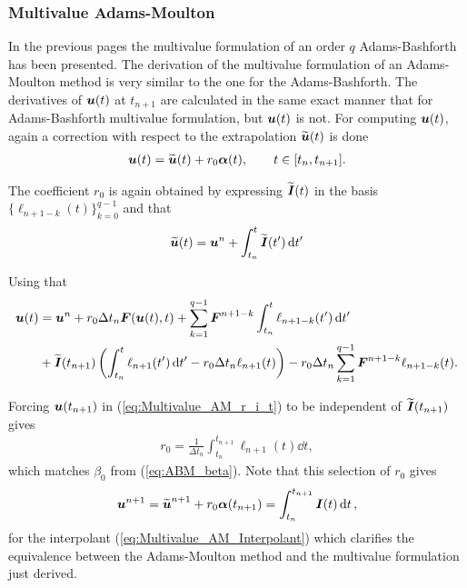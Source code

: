 \subsubsection*{Multivalue Adams-Moulton}
In the previous pages the multivalue formulation of an order $q$ Adams-Bashforth has been presented. The derivation of the multivalue formulation of an Adams-Moulton method is very similar to the one for the Adams-Bashforth. The derivatives of $\boldsymbol{u}(t)$ at $t_{n+1}$ are calculated in the same exact manner that for Adams-Bashforth multivalue formulation, but $\boldsymbol{u}(t)$ is not. For computing $\boldsymbol{u}(t)$, again a correction with respect to the extrapolation $\widetilde{\boldsymbol{u}}(t)$ is done
%
\begin{align}
	\boldsymbol{u}(t)
	=
	\widetilde{\boldsymbol{u}}(t)
	+
	r_0 \boldsymbol{\alpha}(t),
	\qquad
	t\in[t_{n},t_{n+1}]
	\label{eq:Multivalue_AM}.
\end{align}

The coefficient $r_0$ is again obtained by expressing $\widetilde{ \boldsymbol{I}}(t)$ in the basis $\{\ell_{n+1-k}(t)\}_{k=0}^{q-1}$ and
that
%
\begin{align}
	\widetilde{\boldsymbol{u}}(t)
	=
	\boldsymbol{u}^n
	+
	\int_{t_n}^{t}
	\widetilde{ \boldsymbol{I}}(t')
	\dd{t'}
\end{align}

Using that 
\begin{align}
	\boldsymbol{u}(t)
	& = 
	\boldsymbol{u}^n
	+
	r_0
	\Delta t_n
	\boldsymbol{F}(\boldsymbol{u}(t),t)
	+
	\sum_{k=1}^{q-1}
	\boldsymbol{F}^{n+1-k}
	\int_{t_n}^{t}
	\ell_{n+1-k}(t')
	\dd{t'}
	\nonumber
	\\
	&
	+
	\widetilde{\boldsymbol{I}}(t_{n+1})
	\left(
	\int_{t_n}^{t}
	\ell_{n+1}(t')
	\dd{t'}
    -
    r_0 \Delta t_n
	\ell_{n+1}(t)
	\right)
	-
	r_0	\Delta t_n
	\sum_{k=1}^{q-1}
	\boldsymbol{F}^{n+1-k}
	\ell_{n+1-k}(t)
	.
	\label{eq:Multivalue_AM_r_i_t}
\end{align}

Forcing $\boldsymbol{u}(t_{n+1})$ in (\ref{eq:Multivalue_AM_r_i_t}) to be independent of $\widetilde{\boldsymbol{I}}(t_{n+1})$ gives
%
\begin{align}
	r_0 
	=
	\frac{1}{\Delta t_n}
	\int_{t_n}^{t_{n+1}}
	\ell_{n+1}(t)
	\dd{t},
    \label{eq:Multivalue_AM_r0}
\end{align}
which matches $\beta_0$ from (\ref{eq:ABM_beta}). Note that this selection of $r_0$ gives 
%
\begin{align}
	\boldsymbol{u}^{n+1}
	=
	\widetilde{\boldsymbol{u}}^{n+1}
	+
	r_0
	\boldsymbol{\alpha}(t_{n+1})
	=
	\int_{t_n}^{t_{n+1}}
	\boldsymbol{I}(t)
	\dd{t},
\end{align}
for the interpolant (\ref{eq:Multivalue_AM_Interpolant}) which clarifies the equivalence between the Adams-Moulton method and the multivalue formulation just derived.

